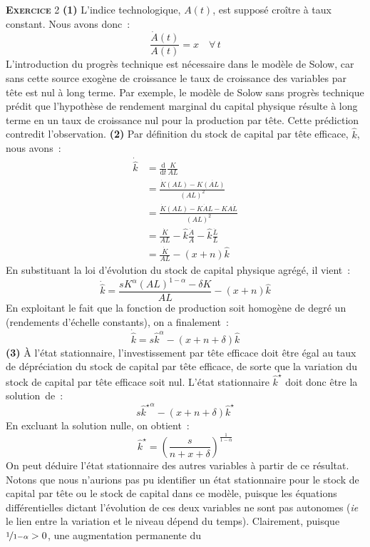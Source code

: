 \documentclass[10pt,a4paper,notitlepage]{report}
\newcommand{\exercice}[1]{\textsc{\textbf{Exercice}} #1}
\newcommand{\question}[1]{\textbf{(#1)}}
\begin{document}
\exercice{2} \question{1} L'indice  technologique, $A(t)$, est supposé
croître à taux constant. Nous avons donc :
\[
\frac{\dot A(t)}{A(t)} = x \quad \forall\, t
\]
L'introduction du progrès  technique est nécessaire dans  le modèle de
Solow,  car  sans  cette  source  exogène de  croissance  le  taux  de
croissance des variables  par tête est nul à long  terme. Par exemple,
le modèle  de Solow sans  progrès technique prédit que  l'hypothèse de
rendement marginal du capital physique résulte à long terme en un taux
de  croissance nul  pour  la production  par  tête.  Cette  prédiction
contredit  l'observation.  \question{2}  Par définition  du  stock  de
capital par tête efficace, $\hat k$, nous avons :
\[
\begin{split}
  \dot{\hat{k}} &= \frac{\mathrm d}{\mathrm d t}\frac{K}{AL}\\
&= \frac{\dot K (AL) - K \dot{(AL)}}{(AL)^2}\\
&= \frac{\dot K (AL) - K \dot A L - K A \dot L}{(AL)^2}\\
&= \frac{\dot K}{AL} - \hat k \frac{\dot A}{A} - \hat k \frac{\dot L}{L}\\
&= \frac{\dot K}{AL} - (x+n)\hat k
\end{split}
\]
En substituant la loi d'évolution du stock de capital physique agrégé,
il vient :
\[
\dot{\hat{k}} = \frac{s K^{\alpha}(AL)^{1-\alpha}-\delta K}{AL} - (x+n)\hat k 
\]
En exploitant le  fait que la fonction de production  soit homogène de
degré un (rendements d'échelle constants), on a finalement :
\[
\dot{\hat{k}} = s \hat k^{\alpha} - (x+n+\delta)\hat k 
\]
\question{3} À l'état stationnaire, l'investissement par tête efficace
doit être  égal au taux de  dépréciation du stock de  capital par tête
efficace,  de sorte  que la  variation du  stock de  capital par  tête
efficace soit nul.  L'état stationnaire $\hat k^\star$  doit donc être
la solution de :
\[
s \left.{\hat k}^\star\right.^{\alpha} - (x+n+\delta){\hat k}^\star
\]
En excluant la solution nulle, on obtient :
\[
{\hat k}^\star = \left(\frac{s}{n+x+\delta}\right)^{\frac{1}{1-\alpha}}
\]
On peut déduire  l'état stationnaire des autres variables  à partir de
ce  résultat. Notons  que nous  n'aurions  pas pu  identifier un  état
stationnaire pour le stock de capital  par tête ou le stock de capital
dans  ce   modèle,  puisque  les  équations   différentielles  dictant
l'évolution de ces deux variables  ne sont pas autonomes (\emph{ie} le
lien entre  la variation  et le niveau  dépend du  temps). Clairement,
puisque  $\nicefrac{1}{1-\alpha}>0$,  une augmentation  permanente  du
\end{document}
